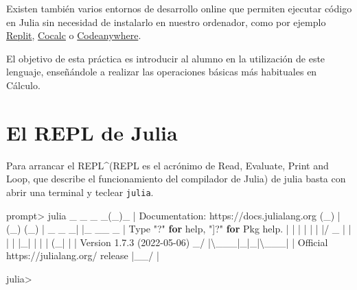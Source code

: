 \documentclass[
  a4paper,
]{scrreport}
\newenvironment{Shaded}{\begin{snugshade}}{\end{snugshade}}
\newcommand{\BuiltInTok}[1]{\textcolor[rgb]{0.00,0.23,0.31}{#1}}
\newcommand{\ControlFlowTok}[1]{\textcolor[rgb]{0.00,0.23,0.31}{\textbf{#1}}}
\newcommand{\DataTypeTok}[1]{\textcolor[rgb]{0.68,0.00,0.00}{#1}}
\newcommand{\FloatTok}[1]{\textcolor[rgb]{0.68,0.00,0.00}{#1}}
\newcommand{\FunctionTok}[1]{\textcolor[rgb]{0.28,0.35,0.67}{#1}}
\newcommand{\NormalTok}[1]{\textcolor[rgb]{0.00,0.23,0.31}{#1}}
\newcommand{\OperatorTok}[1]{\textcolor[rgb]{0.37,0.37,0.37}{#1}}
\newcommand{\SpecialStringTok}[1]{\textcolor[rgb]{0.13,0.47,0.30}{#1}}
\newcommand{\StringTok}[1]{\textcolor[rgb]{0.13,0.47,0.30}{#1}}
\theoremstyle{definition}
\theoremstyle{remark}
\begin{document}
Existen también varios entornos de desarrollo online que permiten
ejecutar código en Julia sin necesidad de instalarlo en nuestro
ordenador, como por ejemplo
\href{https://replit.com/languages/julia}{Replit},
\href{https://cocalc.com/}{Cocalc} o
\href{https://codeanywhere.com/languages/julia}{Codeanywhere}.

El objetivo de esta práctica es introducir al alumno en la utilización
de este lenguaje, enseñándole a realizar las operaciones básicas más
habituales en Cálculo.

\section{El REPL de Julia}\label{el-repl-de-julia}

Para arrancar el REPL\^{}(REPL es el acrónimo de Read, Evaluate, Print
and Loop, que describe el funcionamiento del compilador de Julia) de
julia basta con abrir una terminal y teclear \texttt{julia}.

\begin{Shaded}
\begin{Highlighting}[]
\NormalTok{prompt}\OperatorTok{\textgreater{}}\NormalTok{ julia}
\NormalTok{               \_}
\NormalTok{   \_       \_ }\FunctionTok{\_}\NormalTok{(\_)\_     }\OperatorTok{|}\NormalTok{  Documentation}\OperatorTok{:}\NormalTok{ https}\OperatorTok{://}\NormalTok{docs.julialang.org}
\NormalTok{  (\_)     }\OperatorTok{|}\NormalTok{ (\_) (\_)    }\OperatorTok{|}
\NormalTok{   \_ \_   \_}\OperatorTok{|} \OperatorTok{|}\NormalTok{\_  \_\_ \_   }\OperatorTok{|}  \DataTypeTok{Type} \StringTok{"?"} \ControlFlowTok{for}\NormalTok{ help, }\StringTok{"]?"} \ControlFlowTok{for} \BuiltInTok{Pkg}\NormalTok{ help.}
  \OperatorTok{|} \OperatorTok{|} \OperatorTok{|} \OperatorTok{|} \OperatorTok{|} \OperatorTok{|} \OperatorTok{|/}\NormalTok{ \_}\SpecialStringTok{\textasciigrave{} |  |}
  \OperatorTok{|} \OperatorTok{|} \OperatorTok{|}\NormalTok{\_}\OperatorTok{|} \OperatorTok{|} \OperatorTok{|} \OperatorTok{|}\NormalTok{ (\_}\OperatorTok{|} \OperatorTok{|}  \OperatorTok{|}\NormalTok{  Version }\FloatTok{1.7.3}\NormalTok{ (}\FloatTok{2022}\OperatorTok{{-}}\FloatTok{05}\OperatorTok{{-}}\FloatTok{06}\NormalTok{)}
\NormalTok{ \_}\OperatorTok{/} \OperatorTok{|\textbackslash{}}\NormalTok{\_\_}\OperatorTok{\textquotesingle{}}\NormalTok{\_}\OperatorTok{|}\NormalTok{\_}\OperatorTok{|}\NormalTok{\_}\OperatorTok{|\textbackslash{}}\NormalTok{\_\_}\OperatorTok{\textquotesingle{}}\NormalTok{\_}\OperatorTok{|}  \OperatorTok{|}\NormalTok{  Official https}\OperatorTok{://}\NormalTok{julialang.org}\OperatorTok{/}\NormalTok{ release}
\OperatorTok{|}\NormalTok{\_\_}\OperatorTok{/}                   \OperatorTok{|}

\NormalTok{julia}\OperatorTok{\textgreater{}}
\end{Highlighting}
\end{Shaded}
\end{document}
